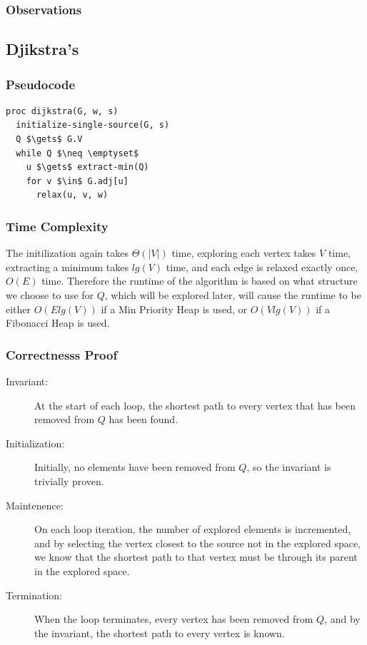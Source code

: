 \documentclass[a4paper,12pt]{article}
\begin{document}
\subsubsection{Observations}
\subsection{Djikstra's}
\subsubsection{Pseudocode}
\begin{lstlisting}[mathescape=true]
proc dijkstra(G, w, s)
  initialize-single-source(G, s)
  Q $\gets$ G.V
  while Q $\neq \emptyset$
    u $\gets$ extract-min(Q)
    for v $\in$ G.adj[u]
      relax(u, v, w)
\end{lstlisting}
\subsubsection{Time Complexity}
The initilization again takes $\Theta(|V|)$ time, exploring each vertex takes $V$ time, extracting a minimum takes $lg(V)$ time, and each edge is relaxed exactly once, $O(E)$ time. Therefore the runtime of the algorithm is based on what structure we choose to use for $Q$, which will be explored later, will cause the runtime to be either $O(Elg(V))$ if a Min Priority Heap is used, or $O(Vlg(V))$ if a Fibonacci Heap is used.
\subsubsection{Correctnesss Proof}
\begin{description}
\item [Invariant: ] At the start of each loop, the shortest path to every vertex that has been removed from $Q$ has been found.
\item [Initialization: ] Initially, no elements have been removed from $Q$, so the invariant is trivially proven.
\item [Maintenence: ] On each loop iteration, the number of explored elements is incremented, and by selecting the vertex closest to the source not in the explored space, we know that the shortest path to that vertex must be through its parent in the explored space.
\item [Termination: ] When the loop terminates, every vertex has been removed from $Q$, and by the invariant, the shortest path to every vertex is known.
\end{description}
\end{document}
